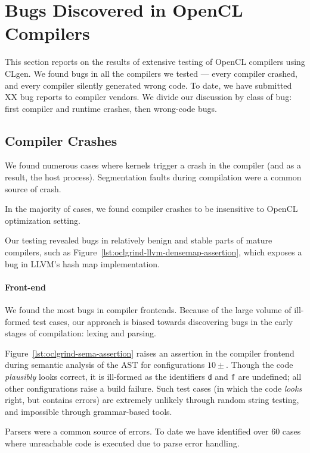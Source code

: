 \section{Bugs Discovered in OpenCL Compilers}

This section reports on the results of extensive testing of OpenCL compilers using CLgen. We found bugs in all the compilers we tested --- every compiler crashed, and every compiler silently generated wrong code. To date, we have submitted XX bug reports to compiler vendors. We divide our discussion by class of bug: first compiler and runtime crashes, then wrong-code bugs.

\subsection{Compiler Crashes}

We found numerous cases where kernels trigger a crash in the compiler (and as a result, the host process). Segmentation faults during compilation were a common source of crash.

In the majority of cases, we found compiler crashes to be insensitive to OpenCL optimization setting.

Our testing revealed bugs in relatively benign and stable parts of mature compilers, such as Figure~\ref{lst:oclgrind-llvm-densemap-assertion}, which exposes a bug in LLVM's hash map implementation.

\paragraph{Front-end} We found the most bugs in compiler frontends. Because of the large volume of ill-formed test cases, our approach is biased towards discovering bugs in the early stages of compilation: lexing and parsing.

Figure~\ref{lst:oclgrind-sema-assertion} raises an assertion in the compiler frontend during semantic analysis of the AST for configurations $10\pm$. Though the code \emph{plausibly} looks correct, it is ill-formed as the identifiers \texttt{d} and \texttt{f} are undefined; all other configurations raise a build failure. Such test cases (in which the code \emph{looks} right, but contains errors) are extremely unlikely through random string testing, and impossible through grammar-based tools.

Parsers were a common source of errors. To date we have identified over 60 cases where unreachable code is executed due to parse error handling. 

